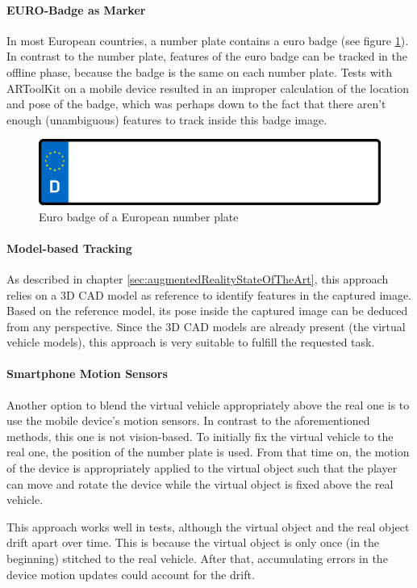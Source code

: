 \paragraph{EURO-Badge as Marker}
In most European countries, a number plate contains a euro badge (see figure \ref{fig:euroBadge}). In contrast to the number plate, features of the euro badge can be tracked in the offline phase, because the badge is the same on each number plate.
Tests with ARToolKit on a mobile device resulted in an improper calculation of the location and pose of the badge, which was perhaps down to the fact that there aren’t enough (unambiguous) features to track inside this badge image.

\begin{figure}[bth]
  \centering
        \includegraphics[width=.25\linewidth]{gfx/marker_full}
        \caption{Euro badge of a European number plate}
        \label{fig:euroBadge}
\end{figure}

\paragraph{Model-based Tracking}
As described in chapter \ref{sec:augmentedRealityStateOfTheArt}, this approach relies on a 3D CAD model as reference to identify features in the captured image. Based on the reference model, its pose inside the captured image can be deduced from any perspective. Since the 3D CAD models are already present (the virtual vehicle models), this approach is very suitable to fulfill the requested task.

\paragraph{Smartphone Motion Sensors}
Another option to blend the virtual vehicle appropriately above the real one is to use the mobile device’s motion sensors. In contrast to the aforementioned methods, this one is not vision-based. To initially fix the virtual vehicle to the real one, the position of the number plate is used. From that time on, the motion of the device is appropriately applied to the virtual object such that the player can move and rotate the device while the virtual object is fixed above the real vehicle.

This approach works well in tests, although the virtual object and the real object drift apart over time. This is because the virtual object is only once (in the beginning) stitched to the real vehicle. After that, accumulating errors in the device motion updates could account for the drift.

